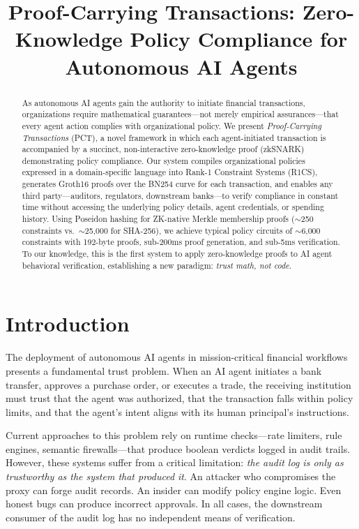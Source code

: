 \documentclass[conference]{IEEEtran}
\title{Proof-Carrying Transactions: Zero-Knowledge Policy Compliance for Autonomous AI Agents}
\author{
\IEEEauthorblockN{Atrosha Research}
\IEEEauthorblockA{Atrosha Labs}
}
\begin{document}
\maketitle

\begin{abstract}
As autonomous AI agents gain the authority to initiate financial transactions, organizations require mathematical guarantees---not merely empirical assurances---that every agent action complies with organizational policy. We present \textit{Proof-Carrying Transactions} (PCT), a novel framework in which each agent-initiated transaction is accompanied by a succinct, non-interactive zero-knowledge proof (zkSNARK) demonstrating policy compliance. Our system compiles organizational policies expressed in a domain-specific language into Rank-1 Constraint Systems (R1CS), generates Groth16 proofs over the BN254 curve for each transaction, and enables any third party---auditors, regulators, downstream banks---to verify compliance in constant time without accessing the underlying policy details, agent credentials, or spending history. Using Poseidon hashing for ZK-native Merkle membership proofs ($\sim$250 constraints vs.\ $\sim$25,000 for SHA-256), we achieve typical policy circuits of $\sim$6,000 constraints with 192-byte proofs, sub-200ms proof generation, and sub-5ms verification. To our knowledge, this is the first system to apply zero-knowledge proofs to AI agent behavioral verification, establishing a new paradigm: \textit{trust math, not code}.
\end{abstract}

\section{Introduction}

The deployment of autonomous AI agents in mission-critical financial workflows presents a fundamental trust problem. When an AI agent initiates a bank transfer, approves a purchase order, or executes a trade, the receiving institution must trust that the agent was authorized, that the transaction falls within policy limits, and that the agent's intent aligns with its human principal's instructions.

Current approaches to this problem rely on runtime checks---rate limiters, rule engines, semantic firewalls---that produce boolean verdicts logged in audit trails. However, these systems suffer from a critical limitation: \textit{the audit log is only as trustworthy as the system that produced it}. An attacker who compromises the proxy can forge audit records. An insider can modify policy engine logic. Even honest bugs can produce incorrect approvals. In all cases, the downstream consumer of the audit log has no independent means of verification.
\end{document}
